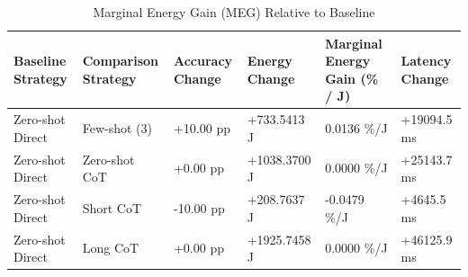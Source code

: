 \begin{table}
\caption{Marginal Energy Gain (MEG) Relative to Baseline}
\label{tab:marginal_energy_gain}
\begin{tabular}{llllll}
\toprule
Baseline Strategy & Comparison Strategy & Accuracy Change & Energy Change & Marginal Energy Gain (\% / J) & Latency Change \\
\midrule
Zero-shot Direct & Few-shot (3) & +10.00 pp & +733.5413 J & 0.0136 \%/J & +19094.5 ms \\
Zero-shot Direct & Zero-shot CoT & +0.00 pp & +1038.3700 J & 0.0000 \%/J & +25143.7 ms \\
Zero-shot Direct & Short CoT & -10.00 pp & +208.7637 J & -0.0479 \%/J & +4645.5 ms \\
Zero-shot Direct & Long CoT & +0.00 pp & +1925.7458 J & 0.0000 \%/J & +46125.9 ms \\
\bottomrule
\end{tabular}
\end{table}
